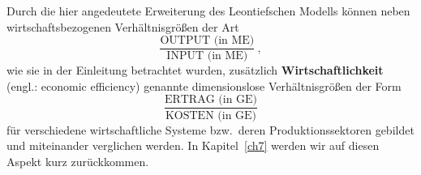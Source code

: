 \medskip
\noindent
Durch die hier angedeutete Erweiterung des Leontiefschen
Modells k\"onnen  neben wirtschaftsbezogenen
Verh\"altnisgr\"o\ss en der Art
%
\[
\frac{\text{OUTPUT (in ME)}}{\text{INPUT (in ME)}} \ ,
\]
%
wie sie in der Einleitung betrachtet wurden, zus\"atzlich
{\bf Wirtschaftlichkeit} (engl.: economic efficiency) genannte 
dimensionslose Verh\"altnisgr\"o\ss en der Form
%
\[
\frac{\text{ERTRAG (in GE)}}{\text{KOSTEN (in GE)}}
\]
%
f\"ur verschiedene wirtschaftliche Systeme bzw.\ deren
Produktionssektoren gebildet und miteinander verglichen werden.
In Kapitel~\ref{ch7} werden wir auf diesen Aspekt kurz
zur\"uckkommen.

